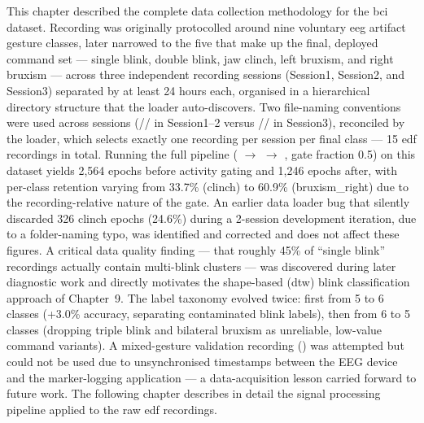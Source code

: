 This chapter described the complete data collection methodology
for the \acrshort{bci} dataset. Recording was originally
protocolled around nine voluntary \acrshort{eeg} artifact gesture
classes, later narrowed to the five that make up the final,
deployed command set --- single blink, double blink, jaw clinch,
left bruxism, and right bruxism --- across three independent
recording sessions (Session1, Session2, and Session3) separated
by at least 24 hours each, organised in a hierarchical directory
structure that the loader auto-discovers. Two file-naming
conventions were used across sessions
(// in Session1--2
versus // in Session3),
reconciled by the loader, which selects exactly one recording per
session per final class --- 15 \acrshort{edf} recordings in
total. Running the full pipeline
( $\rightarrow$
 $\rightarrow$
, gate fraction 0.5) on this
dataset yields 2{,}564 epochs before activity gating and
1{,}246 epochs after, with per-class retention varying from
33.7\% (clinch) to 60.9\% (bruxism\_right) due to the
recording-relative nature of the gate. An earlier data loader bug
that silently discarded 326 clinch epochs (24.6\%) during a
2-session development iteration, due to a folder-naming typo, was
identified and corrected and does not affect these figures. A
critical data quality finding --- that roughly 45\% of ``single
blink'' recordings actually contain multi-blink clusters --- was
discovered during later diagnostic work and directly motivates
the shape-based (\acrshort{dtw}) blink classification approach of
Chapter~9. The label taxonomy evolved twice: first from 5 to 6
classes (+3.0\% accuracy, separating contaminated blink labels),
then from 6 to 5 classes (dropping triple blink and bilateral
bruxism as unreliable, low-value command variants). A
mixed-gesture validation recording () was attempted
but could not be used due to unsynchronised timestamps between
the EEG device and the marker-logging application --- a
data-acquisition lesson carried forward to future work. The
following chapter describes in detail the signal processing
pipeline applied to the raw \acrshort{edf} recordings.